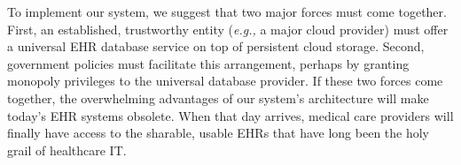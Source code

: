 To implement our system, we suggest that two major forces must come together. First, an established, trustworthy entity (\textit{e.g.,} a major cloud provider) must offer a universal EHR database service on top of persistent cloud storage. Second, government policies must facilitate this arrangement, perhaps by granting monopoly privileges to the universal database provider. If these two forces come together, the overwhelming advantages of our system's architecture will make today's EHR systems obsolete. When that day arrives, medical care providers will finally have access to the sharable, usable EHRs that have long been the holy grail of healthcare IT.

%






























